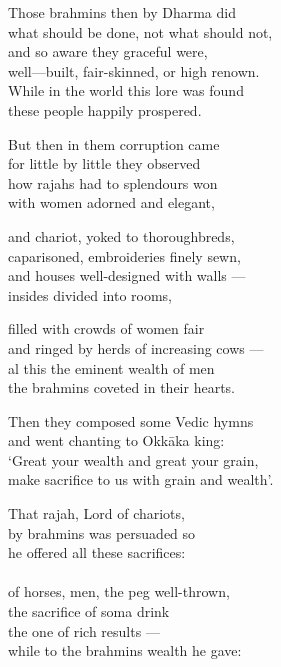 \begin{MyDescription}{}
Those brahmins then by Dharma did\\
what should be done, not what should not,\\
and so aware they graceful were,\\
well—built, fair-skinned, or high renown.\\
While in the world this lore was found\\
these people happily prospered.
\end{MyDescription}  

\begin{MyDescription}{}
But then in them corruption came\\
for little by little they observed\\
how rajahs had to splendours won\\
with women adorned and elegant,
\end{MyDescription}    
   
\begin{MyDescription}{}
and chariot, yoked to thoroughbreds,\\
caparisoned, embroideries ﬁnely sewn,\\
and houses well-designed with walls —\\
insides divided into rooms,
\end{MyDescription}    
   
\begin{MyDescription}{}
filled with crowds of women fair\\
and ringed by herds of increasing cows —\\
al this the eminent wealth of men\\
the brahmins coveted in their hearts.
\end{MyDescription}    

\begin{MyDescription}{}
Then they composed some Vedic hymns\\
and went chanting to Okk\=aka king:\\
`Great your wealth and great your grain,\\
make sacrifice to us with grain and wealth'.
\end{MyDescription}    

\begin{MyDescription}{}
That rajah, Lord of chariots,\\
by brahmins was persuaded so\\
he offered all these sacriﬁces:\\
\\
of horses, men, the peg well-thrown,\\
the sacrifice of soma drink\\
the one of rich results —\\
while to the brahmins wealth he gave:
\end{MyDescription}    
   
